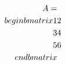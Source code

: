 \documentclass[preview]{standalone}
\begin{document}
\begin{align*}
\special{dvisvgm:raw <g id='unique000'>}A = \\begin{bmatrix} 1 & 2 \\ 3 & 4 \\ 5 & 6 \\end{bmatrix}\special{dvisvgm:raw </g>}
\end{align*}
\end{document}
